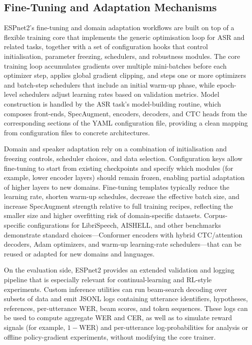 \documentclass[conference]{IEEEtran}
\begin{document}
\subsection{Fine-Tuning and Adaptation Mechanisms}

ESPnet2’s fine-tuning and domain adaptation workflows are built on top of a flexible training core that implements the generic optimisation loop for ASR and related tasks, together with a set of configuration hooks that control initialisation, parameter freezing, schedulers, and robustness modules.
The core training loop accumulates gradients over multiple mini-batches before each optimizer step, applies global gradient clipping, and steps one or more optimizers and batch-step schedulers that include an initial warm-up phase, while epoch-level schedulers adjust learning rates based on validation metrics.
Model construction is handled by the ASR task’s model-building routine, which composes front-ends, SpecAugment, encoders, decoders, and CTC heads from the corresponding sections of the YAML configuration file, providing a clean mapping from configuration files to concrete architectures.

Domain and speaker adaptation rely on a combination of initialisation and freezing controls, scheduler choices, and data selection.
Configuration keys allow fine-tuning to start from existing checkpoints and specify which modules (for example, lower encoder layers) should remain frozen, enabling partial adaptation of higher layers to new domains.
Fine-tuning templates typically reduce the learning rate, shorten warm-up schedules, decrease the effective batch size, and increase SpecAugment strength relative to full training recipes, reflecting the smaller size and higher overfitting risk of domain-specific datasets.
Corpus-specific configurations for LibriSpeech, AISHELL, and other benchmarks demonstrate standard choices---Conformer encoders with hybrid CTC/attention decoders, Adam optimizers, and warm-up learning-rate schedulers---that can be reused or adapted for new domains and languages.

On the evaluation side, ESPnet2 provides an extended validation and logging pipeline that is especially relevant for continual-learning and RL-style experiments.
Custom inference utilities can run beam-search decoding over subsets of data and emit JSONL logs containing utterance identifiers, hypotheses, references, per-utterance WER, beam scores, and token sequences.
These logs can be used to compute aggregate WER and CER, as well as to simulate reward signals (for example, \(1 - \text{WER}\)) and per-utterance log-probabilities for analysis or offline policy-gradient experiments, without modifying the core trainer.
\end{document}
